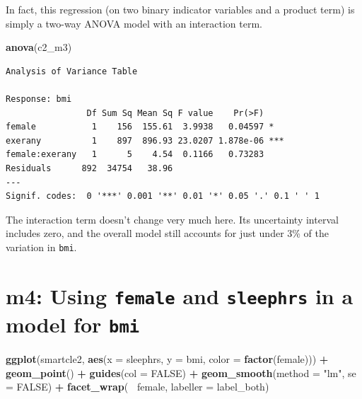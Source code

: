 \documentclass[]{book}
\newenvironment{Shaded}{\begin{snugshade}}{\end{snugshade}}
\newcommand{\KeywordTok}[1]{\textcolor[rgb]{0.13,0.29,0.53}{\textbf{#1}}}
\newcommand{\DataTypeTok}[1]{\textcolor[rgb]{0.13,0.29,0.53}{#1}}
\newcommand{\StringTok}[1]{\textcolor[rgb]{0.31,0.60,0.02}{#1}}
\newcommand{\OtherTok}[1]{\textcolor[rgb]{0.56,0.35,0.01}{#1}}
\newcommand{\OperatorTok}[1]{\textcolor[rgb]{0.81,0.36,0.00}{\textbf{#1}}}
\newcommand{\NormalTok}[1]{#1}
\theoremstyle{definition}
\theoremstyle{definition}
\theoremstyle{definition}
\theoremstyle{remark}
\begin{document}
In fact, this regression (on two binary indicator variables and a
product term) is simply a two-way ANOVA model with an interaction term.

\begin{Shaded}
\begin{Highlighting}[]
\KeywordTok{anova}\NormalTok{(c2_m3)}
\end{Highlighting}
\end{Shaded}

\begin{verbatim}
Analysis of Variance Table

Response: bmi
                Df Sum Sq Mean Sq F value    Pr(>F)    
female           1    156  155.61  3.9938   0.04597 *  
exerany          1    897  896.93 23.0207 1.878e-06 ***
female:exerany   1      5    4.54  0.1166   0.73283    
Residuals      892  34754   38.96                      
---
Signif. codes:  0 '***' 0.001 '**' 0.01 '*' 0.05 '.' 0.1 ' ' 1
\end{verbatim}

The interaction term doesn't change very much here. Its uncertainty
interval includes zero, and the overall model still accounts for just
under 3\% of the variation in \texttt{bmi}.

\section{\texorpdfstring{m4: Using \texttt{female} and \texttt{sleephrs}
in a model for
\texttt{bmi}}{m4: Using female and sleephrs in a model for bmi}}\label{m4-using-female-and-sleephrs-in-a-model-for-bmi}

\begin{Shaded}
\begin{Highlighting}[]
\KeywordTok{ggplot}\NormalTok{(smartcle2, }\KeywordTok{aes}\NormalTok{(}\DataTypeTok{x =}\NormalTok{ sleephrs, }\DataTypeTok{y =}\NormalTok{ bmi, }\DataTypeTok{color =} \KeywordTok{factor}\NormalTok{(female))) }\OperatorTok{+}
\StringTok{    }\KeywordTok{geom_point}\NormalTok{() }\OperatorTok{+}\StringTok{ }
\StringTok{    }\KeywordTok{guides}\NormalTok{(}\DataTypeTok{col =} \OtherTok{FALSE}\NormalTok{) }\OperatorTok{+}
\StringTok{    }\KeywordTok{geom_smooth}\NormalTok{(}\DataTypeTok{method =} \StringTok{"lm"}\NormalTok{, }\DataTypeTok{se =} \OtherTok{FALSE}\NormalTok{) }\OperatorTok{+}
\StringTok{    }\KeywordTok{facet_wrap}\NormalTok{(}\OperatorTok{~}\StringTok{ }\NormalTok{female, }\DataTypeTok{labeller =}\NormalTok{ label_both) }
\end{Highlighting}
\end{Shaded}
\end{document}
